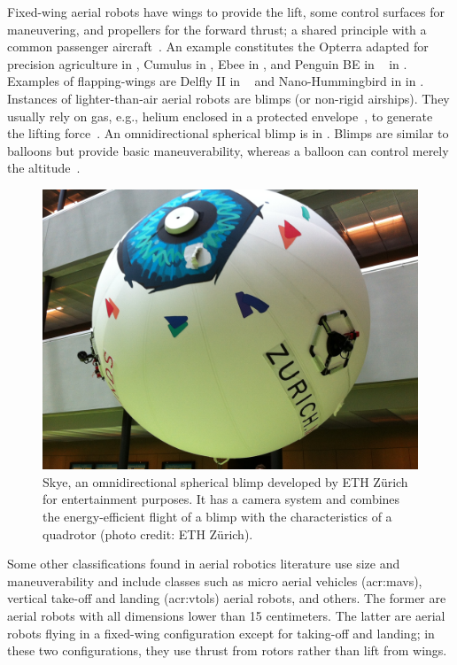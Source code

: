Fixed-wing aerial robots have wings to provide the lift, some control surfaces for maneuvering, and propellers for the forward thrust; a shared principle with a common passenger aircraft~\citep{corke2017robotics}. An example constitutes the Opterra adapted for precision agriculture in , Cumulus in , Ebee in , and Penguin BE in ~\citep{haugen2016monitoring} in . Examples of flapping-wings are Delfly II in ~\citep{percin2012flow} and Nano-Hummingbird in  in . Instances of lighter-than-air aerial robots are blimps (or non-rigid airships). They usually rely on gas, e.g., helium enclosed in a protected envelope~\citep{burri2013design}, to generate the lifting force~\citep{fui2017recent}. An omnidirectional spherical blimp is in . Blimps are similar to balloons but provide basic maneuverability, whereas a balloon can control merely the altitude~\citep{colombatti2011lighter}.
\begin{figure}[t]
  \centering
  \includegraphics[width=.7\textwidth]{pictures/IMG_2612}
  \caption[Skye, an omnidirectional spherical blimp]{Skye, an omnidirectional spherical blimp developed by ETH Z\"urich for entertainment purposes. It has a camera system and combines the energy-efficient flight of a blimp with the characteristics of a quadrotor {\scriptsize(photo credit: ETH Z\"urich)}.}   
  \label{fig:skye-blimp}
\end{figure}
Some other classifications found in aerial robotics literature use size and maneuverability and include classes such as micro aerial vehicles (\Gls{acr:mav}s), vertical take-off and landing (\Gls{acr:vtol}s) aerial robots, and others. The former are aerial robots with all dimensions lower than 15 centimeters. The latter are aerial robots flying in a fixed-wing configuration except for taking-off and landing; in these two configurations, they use thrust from rotors rather than lift from wings. 

